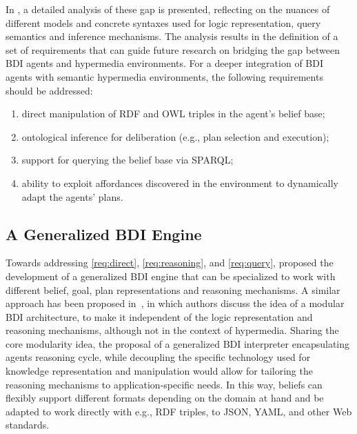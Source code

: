 In \cite{burattini2025gap}, a detailed analysis of these gap is presented, reflecting on the nuances of different models and concrete syntaxes used for logic representation, query semantics and inference mechanisms.
%
The analysis results in the definition of a set of requirements that can guide future research on bridging the gap between \ac{BDI} agents and hypermedia environments.
%
For a deeper integration of \ac{BDI} agents with semantic hypermedia environments, the following requirements should be addressed:
\begin{enumerate}[label=\textbf{(R\arabic*)}]
  \item direct manipulation of \ac{RDF} and \ac{OWL} triples in the agent's belief base;
  \label{req:direct}

  \item ontological inference for deliberation (e.g., plan selection and execution);
  \label{req:reasoning}

  \item support for querying the belief base via \acs{SPARQL};
  \label{req:query}

  \item ability to exploit affordances discovered in the environment to dynamically adapt the agents' plans.
  \label{req:actions}
\end{enumerate}

\subsection{A Generalized BDI Engine}

Towards addressing \ref{req:direct}, \ref{req:reasoning}, and \ref{req:query}, \cite{burattini2025gap} proposed the development of a generalized \ac{BDI} engine that can be specialized to work with different belief, goal, plan representations and reasoning mechanisms. 
%
A similar approach has been proposed in~\cite{novak2006atal}, 
in which authors discuss the idea of a modular \ac{BDI} architecture,
to make it independent of the logic representation and reasoning mechanisms,
although not in the context of hypermedia.
%
Sharing the core modularity idea, the proposal of a generalized \ac{BDI} interpreter encapsulating agents reasoning cycle,
while decoupling the specific technology used for knowledge representation and manipulation would allow for tailoring the reasoning mechanisms to application-specific needs.
%
In this way,
beliefs
can flexibly support different formats depending on the domain at hand
and be adapted to work directly with e.g., \ac{RDF} triples, to JSON, YAML, and other Web standards.

